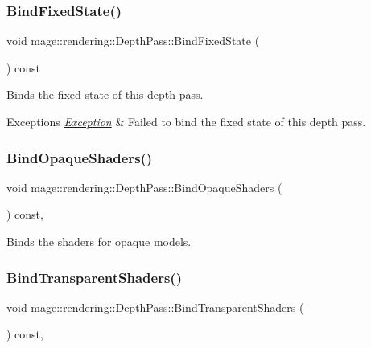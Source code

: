 \subsubsection{\texorpdfstring{Bind\+Fixed\+State()}{BindFixedState()}}
{\footnotesize\ttfamily void mage\+::rendering\+::\+Depth\+Pass\+::\+Bind\+Fixed\+State (\begin{DoxyParamCaption}{ }\end{DoxyParamCaption}) const\hspace{0.3cm}{\ttfamily [noexcept]}}

Binds the fixed state of this depth pass.


\begin{DoxyExceptions}{Exceptions}
{\em \mbox{\hyperlink{classmage_1_1_exception}{Exception}}} & Failed to bind the fixed state of this depth pass. \\
\hline
\end{DoxyExceptions}
\mbox{\label{classmage_1_1rendering_1_1_depth_pass_aeab0d647dbdc50233cfa4169282682fe}} 
\subsubsection{\texorpdfstring{Bind\+Opaque\+Shaders()}{BindOpaqueShaders()}}
{\footnotesize\ttfamily void mage\+::rendering\+::\+Depth\+Pass\+::\+Bind\+Opaque\+Shaders (\begin{DoxyParamCaption}{ }\end{DoxyParamCaption}) const\hspace{0.3cm}{\ttfamily [private]}, {\ttfamily [noexcept]}}

Binds the shaders for opaque models. \mbox{\label{classmage_1_1rendering_1_1_depth_pass_a7c136dce9484e14b4a803f9ec84a10b8}} 
\subsubsection{\texorpdfstring{Bind\+Transparent\+Shaders()}{BindTransparentShaders()}}
{\footnotesize\ttfamily void mage\+::rendering\+::\+Depth\+Pass\+::\+Bind\+Transparent\+Shaders (\begin{DoxyParamCaption}{ }\end{DoxyParamCaption}) const\hspace{0.3cm}{\ttfamily [private]}, {\ttfamily [noexcept]}}

